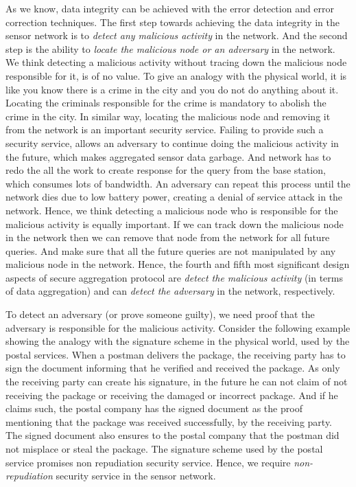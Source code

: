 	As we know, data integrity can be achieved with the error detection and error correction techniques.
	The first step towards achieving the data integrity in the sensor network is to \textit{detect any malicious activity} in the network.
	And the second step is the ability to \textit{locate the malicious node or an adversary} in the network.
	We think detecting a malicious activity without tracing down the malicious node responsible for it, is of no value.
	To give an analogy with the physical world, it is like you know there is a crime in the city and you do not do anything about it.
	Locating the criminals responsible for the crime is mandatory to abolish the crime in the city.
	In similar way, locating the malicious node and removing it from the network is an important security service. 
	Failing to provide such a security service, allows an adversary to continue doing the malicious activity in the future, which makes aggregated sensor data garbage. 
	And network has to redo the all the work to create response for the query from the base station, which consumes lots of bandwidth. 
	An adversary can repeat this process until the network dies due to low battery power, creating a denial of service attack in the network.
	Hence, we think detecting a malicious node who is responsible for the malicious activity is equally important.
	If we can track down the malicious node in the network then we can remove that node from the network for all future queries.
	And make sure that all the future queries are not manipulated by any malicious node in the network.
	Hence, the fourth and fifth most significant design aspects of secure aggregation protocol are \textit{detect the malicious activity} (in terms of data aggregation) and can \textit{detect the adversary} in the network, respectively.

	To detect an adversary (or prove someone guilty), we need proof that the adversary is responsible for the malicious activity.	 
	Consider the following example showing the analogy with the signature scheme in the physical world, used by the postal services.
	When a postman delivers the package, the receiving party has to sign the document informing that he verified and received the package.
	As only the receiving party can create his signature, in the future he can not claim of not receiving the package or receiving the damaged or incorrect package. 
	And if he claims such, the postal company has the signed document as the proof mentioning that the package was received successfully, by the receiving party.
	The signed document also ensures to the postal company that the postman did not misplace or steal the package.
	The signature scheme used by the postal service promises 
	non repudiation security service.
	Hence, we require \textit{non-repudiation} security service in the sensor network.

